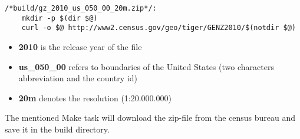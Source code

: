 \begin{lstlisting}[style={makefile}, caption={Make task for downloading cartographic boundaries}, label={lst:data-acqu-zip}]
/*build/gz_2010_us_050_00_20m.zip*/:
    mkdir -p $(dir $@)
    curl -o $@ http://www2.census.gov/geo/tiger/GENZ2010/$(notdir $@)
\end{lstlisting}

\begin{itemize}
\item \textbf{2010} is the release year of the file
\item \textbf{us\_050\_00} refers to boundaries of the United States (two characters abbreviation and the country id)
\item \textbf{20m} denotes the resolution (1:20.000.000)
\end{itemize}

The mentioned Make task will download the zip-file from the census bureau and save it in the build directory.

